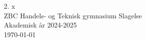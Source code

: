 \begin{titlepage}

    \vspace{1cm}


    \vfill

    2. x \\
    ZBC Handels- og Teknisk gymnasium Slagelse \\
    Akademisk år 2024-2025 \\
    \today
\end{titlepage}
